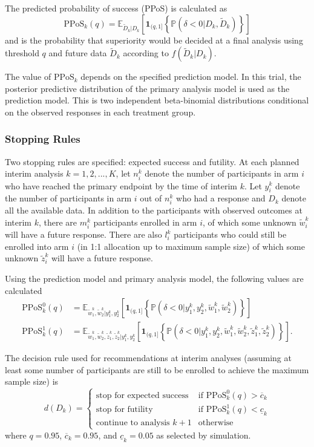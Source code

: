 \documentclass{bmcart}
\begin{document}
The predicted probability of success (PPoS) is calculated as
$$
\text{PPoS}_k(q) = \mathbb E_{\tilde D_k | D_k}\left[\textbf{1}_{(q,1]}\left\{\mathbb P(\delta<0|D_k,\tilde D_k)\right\}\right]
$$
and is the probability that superiority would be decided at a final analysis using threshold $q$ and future data $\tilde D_k$ according to $f(\tilde D_k|D_k)$.

The value of \(\text{PPoS}_k\) depends on the specified prediction model.
In this trial, the posterior predictive distribution of the primary analysis model is used as the prediction model.
This is two independent beta-binomial distributions conditional on the observed responses in each treatment group.

\subsubsection*{Stopping Rules}

Two stopping rules are specified: expected success and futility.
At each planned interim analysis $k=1,2,...,K$, let $n_i^k$ denote the number of participants in arm $i$ who have reached the primary endpoint by the time of interim $k$.
Let $y_i^k$ denote the number of participants in arm $i$ out of $n_i^k$ who had a response and $D_k$ denote all the available data.
In addition to the participants with observed outcomes at interim $k$, there are $m_i^k$ participants enrolled in arm $i$, of which some unknown $\tilde w_i^k$ will have a future response. There are also $l_i^k$ participants who could still be enrolled into arm $i$ (in 1:1 allocation up to maximum sample size) of which some unknown $\tilde z_i^k$ will have a future response.

Using the prediction model and primary analysis model, the following values are calculated
$$
\begin{aligned}
\text{PPoS}_k^0(q) &= \mathbb E_{\tilde w_1^k,\tilde w_2^k|y_1^k,y_2^k}\left[\textbf{1}_{(q,1]}\left\{\mathbb P\left(\delta<0|y_1^k,y_2^k,\tilde w_1^k,\tilde w_2^k\right)\right\}\right] \\
\text{PPoS}_k^1(q) &= \mathbb E_{\tilde w_1^k,\tilde w_2^k,\tilde z_1^k,\tilde z_2^k|y_1^k,y_2^k}\left[\textbf{1}_{(q,1]}\left\{\mathbb P\left(\delta<0|y_1^k,y_2^k,\tilde w_1^k,\tilde w_2^k,\tilde z_1^k,\tilde z_2^k\right)\right\}\right].
\end{aligned}
$$

The decision rule used for recommendations at interim analyses (assuming at least some number of participants are still to be enrolled to achieve the maximum sample size) is
$$
d(D_k)=\begin{cases}
\text{stop for expected success} & \text{if } \text{PPoS}_k^0(q) > \overline{c}_k \\
\text{stop for futility} & \text{if } \text{PPoS}_k^1(q) < \underline{c}_k \\
\text{continue to analysis }k+1 &\text{otherwise}
\end{cases}
$$
where $q=0.95$, $\overline{c}_k=0.95$, and $\underline{c}_k=0.05$ as selected by simulation.
\end{document}
